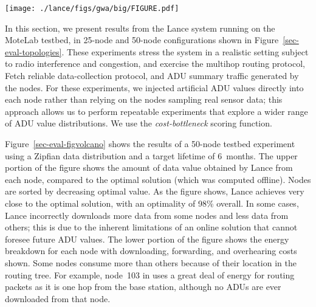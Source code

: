 \begin{figure*}[t]
\begin{center}
\texttt{[image: ./lance/figs/gwa/big/FIGURE.pdf]}
\end{center}
\caption{\small {\bf Optimality and energy use in the 50-node testbed
experiment.} {\em Lance achieved near-optimal performance during 
this 8-hour testbed experiment,
retrieving 98\% of the value obtained by the offline optimal algorithm.}}
\label{sec-eval-figvolcano}
\end{figure*}

In this section, we present results from the Lance system running on the
MoteLab testbed, in 25-node and 50-node configurations shown in
Figure~\ref{sec-eval-topologies}. These experiments stress the system in a
realistic setting subject to radio interference and congestion, and exercise
the multihop routing protocol, Fetch reliable data-collection protocol, and
ADU summary traffic generated by the nodes. For these experiments, we
injected artificial ADU values directly into each node rather than relying on
the nodes sampling real sensor data; this approach allows us to perform
repeatable experiments that explore a wider range of ADU value distributions.
We use the \emph{cost-bottleneck} scoring function. 

Figure~\ref{sec-eval-figvolcano} shows the results of a 50-node testbed
experiment using a Zipfian data distribution and a target lifetime of
6~months.  The upper portion of the figure shows the amount of data value
obtained by Lance from each node, compared to the optimal solution (which was
computed offline). Nodes are sorted by decreasing optimal value. As the
figure shows, Lance achieves very close to the optimal solution, with an
optimality of 98\% overall.  In some cases, Lance incorrectly downloads more
data from some nodes and less data from others; this is due to the inherent
limitations of an online solution that cannot foresee future ADU values.  The
lower portion of the figure shows the energy breakdown for each node with
downloading, forwarding, and overhearing costs shown.  Some nodes consume
more than others because of their location in the routing tree. For example,
node~103 in uses a great deal of energy for routing packets as it is one hop
from the base station, although no ADUs are ever downloaded from that node.

